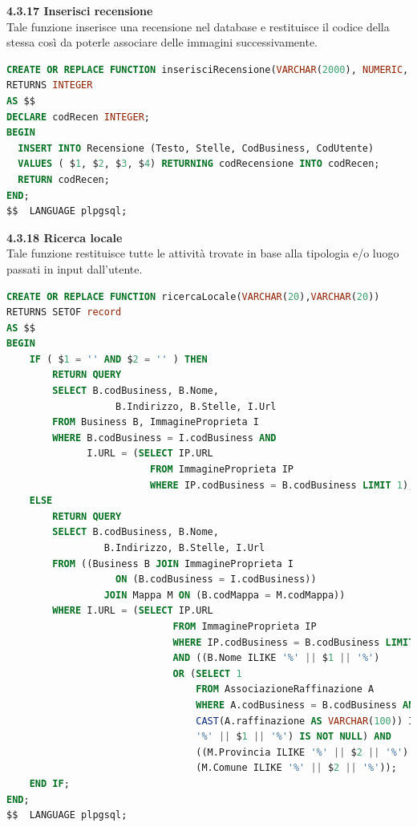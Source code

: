 \documentclass[a4paper,12pt]{article}
\begin{document}
\newpage\null{}\setcounter{page}{23}
\vspace{-2cm}
{\flushleft \bf 4.3.17  Inserisci recensione}\\
Tale funzione inserisce una recensione nel database e restituisce il codice della stessa
così da poterle associare delle immagini successivamente.
\begin{lstlisting}[language=SQL]
CREATE OR REPLACE FUNCTION inserisciRecensione(VARCHAR(2000), NUMERIC, INTEGER, INTEGER)
RETURNS INTEGER
AS $$
DECLARE codRecen INTEGER;
BEGIN
  INSERT INTO Recensione (Testo, Stelle, CodBusiness, CodUtente)
  VALUES ( $1, $2, $3, $4) RETURNING codRecensione INTO codRecen;
  RETURN codRecen;
END;
$$  LANGUAGE plpgsql;
\end{lstlisting}

\vspace*{+1cm}

{\flushleft \bf 4.3.18  Ricerca locale}\\
Tale funzione restituisce tutte le attività trovate in base alla tipologia e/o luogo passati in input dall'utente.
\begin{lstlisting}[language=SQL]
CREATE OR REPLACE FUNCTION ricercaLocale(VARCHAR(20),VARCHAR(20))
RETURNS SETOF record
AS $$
BEGIN
	IF ( $1 = '' AND $2 = '' ) THEN
		RETURN QUERY
		SELECT B.codBusiness, B.Nome, 
				   B.Indirizzo, B.Stelle, I.Url
		FROM Business B, ImmagineProprieta I
		WHERE B.codBusiness = I.codBusiness AND 
			  I.URL = (SELECT IP.URL 
			  		     FROM ImmagineProprieta IP 
			  		     WHERE IP.codBusiness = B.codBusiness LIMIT 1);
	ELSE
		RETURN QUERY
		SELECT B.codBusiness, B.Nome, 
			     B.Indirizzo, B.Stelle, I.Url
		FROM ((Business B JOIN ImmagineProprieta I 
				   ON (B.codBusiness = I.codBusiness)) 
			     JOIN Mappa M ON (B.codMappa = M.codMappa))
		WHERE I.URL = (SELECT IP.URL 
					         FROM ImmagineProprieta IP
					         WHERE IP.codBusiness = B.codBusiness LIMIT 1) 
					         AND ((B.Nome ILIKE '%' || $1 || '%') 
					         OR (SELECT 1
					       	     FROM AssociazioneRaffinazione A
					             WHERE A.codBusiness = B.codBusiness AND 
					             CAST(A.raffinazione AS VARCHAR(100)) ILIKE 
					             '%' || $1 || '%') IS NOT NULL) AND
		                         ((M.Provincia ILIKE '%' || $2 || '%') OR 
		                         (M.Comune ILIKE '%' || $2 || '%'));
	END IF;
END;
$$  LANGUAGE plpgsql;
\end{lstlisting}
\newpage
\end{document}

